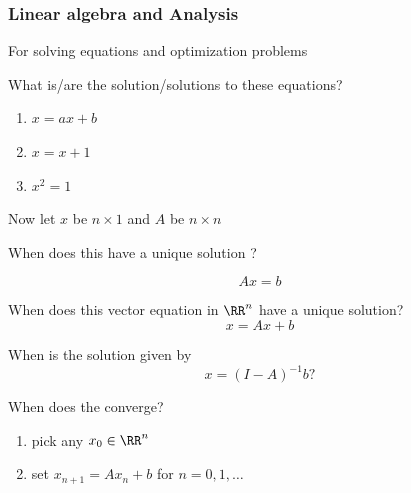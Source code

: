 \begin{frame}
    \frametitle{Linear algebra and Analysis}
    
    For solving equations and optimization problems

    What is/are the solution/solutions to these equations?

    \begin{enumerate}
        \item $x = a x + b$
            \vspace{0.5em}
        \item $x = x + 1$
            \vspace{0.5em}
        \item $x^2 = 1$
    \end{enumerate}

    \pause
    \vspace{0.5em}
    \vspace{0.5em}

    Now let $x$ be $n \times 1$ and $A$ be $n \times n$

    When does this  have a unique solution ?  

    \begin{equation*}
        A x = b
    \end{equation*}
    
\end{frame}


\begin{frame}
    
    When does this vector equation in $\RR^n$ have a unique solution?
    \begin{equation*}
        x = A x + b
    \end{equation*}

    \pause
    \vspace{0.5em}
    When is the solution given by 
    \begin{equation*}
        x = (I - A)^{-1} b ?
    \end{equation*}

    \vspace{0.5em}
    \vspace{0.5em}


    \pause
    When does the  converge?

    \begin{enumerate}
        \item pick any $x_0 \in \RR^n$
            \vspace{0.4em}
        \item set $x_{n+1} = A x_n + b$ for $n = 0, 1, \ldots$
    \end{enumerate}


\end{frame}


